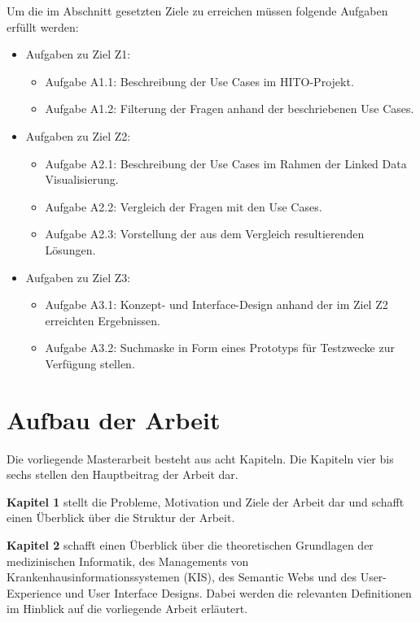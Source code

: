 Um die im Abschnitt  gesetzten Ziele zu erreichen müssen folgende Aufgaben erfüllt werden:

\begin{itemize}
\item Aufgaben zu Ziel Z1:
	\begin{itemize}
	\item Aufgabe A1.1: Beschreibung der Use Cases im HITO-Projekt.
	\item Aufgabe A1.2: Filterung der Fragen anhand der beschriebenen Use Cases.
	\end{itemize}
\item Aufgaben zu Ziel Z2:
	\begin{itemize}
	\item Aufgabe A2.1: Beschreibung der Use Cases im Rahmen der Linked Data Visualisierung.
	\item Aufgabe A2.2: Vergleich der Fragen mit den Use Cases.
	\item Aufgabe A2.3: Vorstellung der aus dem Vergleich resultierenden Lösungen.
	\end{itemize}
\item Aufgaben zu Ziel Z3:
	\begin{itemize}
	\item Aufgabe A3.1: Konzept- und Interface-Design anhand der im Ziel Z2 erreichten Ergebnissen.
	\item Aufgabe A3.2: Suchmaske in Form eines Prototyps für Testzwecke zur Verfügung stellen.
	\end{itemize}
\end{itemize}

\section{Aufbau der Arbeit}\label{sec:aufbau}

Die vorliegende Masterarbeit besteht aus acht Kapiteln. Die Kapiteln vier bis sechs stellen den Hauptbeitrag der Arbeit dar. \newline

\textbf{Kapitel 1} stellt die Probleme, Motivation und Ziele der Arbeit dar und schafft einen Überblick über die Struktur der Arbeit. \newline

\textbf{Kapitel 2} schafft einen Überblick über die theoretischen Grundlagen der medizinischen Informatik, des Managements von Krankenhausinformationssystemen (KIS), des Semantic Webs und des User-Experience und User Interface Designs. Dabei werden die relevanten Definitionen im Hinblick auf die vorliegende Arbeit erläutert.  \newline

